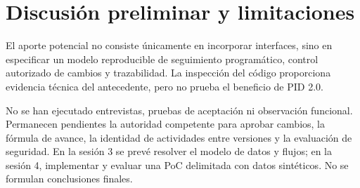 \section{Discusión preliminar y limitaciones}
El aporte potencial no consiste únicamente en incorporar interfaces, sino en especificar un modelo reproducible de seguimiento programático, control autorizado de cambios y trazabilidad. La inspección del código proporciona evidencia técnica del antecedente, pero no prueba el beneficio de PID 2.0.

No se han ejecutado entrevistas, pruebas de aceptación ni observación funcional. Permanecen pendientes la autoridad competente para aprobar cambios, la fórmula de avance, la identidad de actividades entre versiones y la evaluación de seguridad. En la sesión 3 se prevé resolver el modelo de datos y flujos; en la sesión 4, implementar y evaluar una PoC delimitada con datos sintéticos. No se formulan conclusiones finales.
